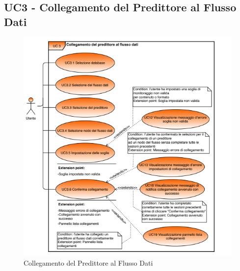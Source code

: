 
	\label{par:UC3}
	\subsection{UC3 - Collegamento del Predittore al Flusso Dati}

		\begin{figure}[H]
		\centering
		\includegraphics[scale=0.70]{../Analisi_dei_requisiti/img/Diagrammi_UML/UC3_collegamento_flusso_dati.png}
		\caption{Collegamento del Predittore al Flusso Dati}
		\end{figure}	

